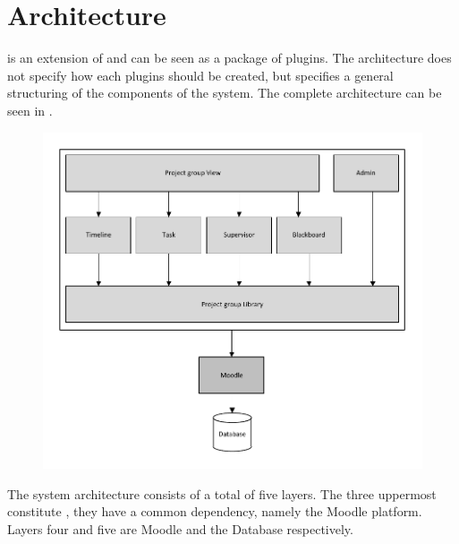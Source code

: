 \section{Architecture}
\label{sec:architecture}
\system{} is an extension of \moodle{} and can be seen as a package of plugins. 
The architecture does not specify how each plugins should be created, but specifies a general structuring of the components of the system. 
The complete architecture can be seen in .
\begin{figure}[h!t]
	\centering
		\includegraphics{images/architecture.pdf}
	\label{fig:architecture}
\end{figure}

The system architecture consists of a total of five layers. 
The three uppermost constitute \system{}, they have a common dependency, namely the Moodle platform. 
Layers four and five are Moodle and the Database respectively.


